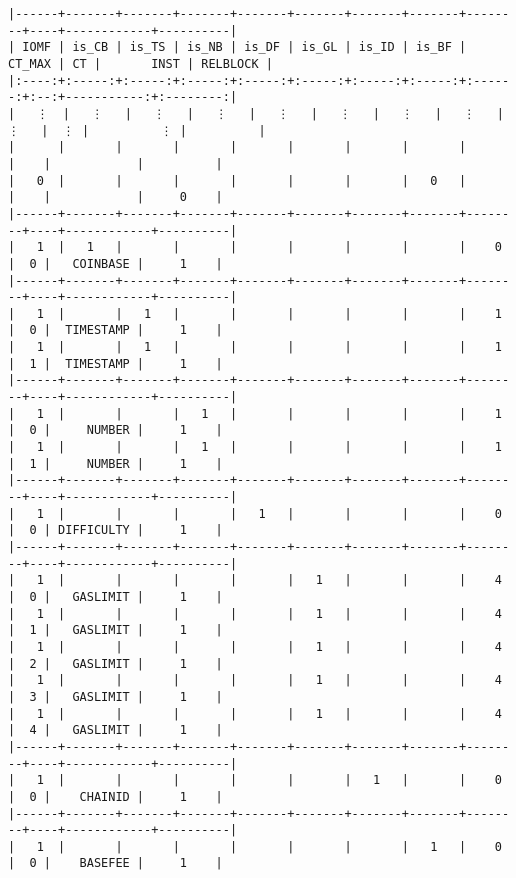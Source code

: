 \documentclass[varwidth=\maxdimen,margin=0.5cm,multi={verbatim}]{standalone}
\begin{document}
\begin{verbatim}
|------+-------+-------+-------+-------+-------+-------+-------+--------+----+------------+----------|
| IOMF | is_CB | is_TS | is_NB | is_DF | is_GL | is_ID | is_BF | CT_MAX | CT |       INST | RELBLOCK |
|:----:+:-----:+:-----:+:-----:+:-----:+:-----:+:-----:+:-----:+:------:+:--:+-----------:+:--------:|
|   ⋮  |   ⋮   |   ⋮   |   ⋮   |   ⋮   |   ⋮   |   ⋮   |   ⋮   |    ⋮   |  ⋮ |          ⋮ |          |
|      |       |       |       |       |       |       |       |        |    |            |          |
|   0  |       |       |       |       |       |       |   0   |        |    |            |     0    |
|------+-------+-------+-------+-------+-------+-------+-------+--------+----+------------+----------|
|   1  |   1   |       |       |       |       |       |       |    0   |  0 |   COINBASE |     1    |
|------+-------+-------+-------+-------+-------+-------+-------+--------+----+------------+----------|
|   1  |       |   1   |       |       |       |       |       |    1   |  0 |  TIMESTAMP |     1    |
|   1  |       |   1   |       |       |       |       |       |    1   |  1 |  TIMESTAMP |     1    |
|------+-------+-------+-------+-------+-------+-------+-------+--------+----+------------+----------|
|   1  |       |       |   1   |       |       |       |       |    1   |  0 |     NUMBER |     1    |
|   1  |       |       |   1   |       |       |       |       |    1   |  1 |     NUMBER |     1    |
|------+-------+-------+-------+-------+-------+-------+-------+--------+----+------------+----------|
|   1  |       |       |       |   1   |       |       |       |    0   |  0 | DIFFICULTY |     1    |
|------+-------+-------+-------+-------+-------+-------+-------+--------+----+------------+----------|
|   1  |       |       |       |       |   1   |       |       |    4   |  0 |   GASLIMIT |     1    |
|   1  |       |       |       |       |   1   |       |       |    4   |  1 |   GASLIMIT |     1    |
|   1  |       |       |       |       |   1   |       |       |    4   |  2 |   GASLIMIT |     1    |
|   1  |       |       |       |       |   1   |       |       |    4   |  3 |   GASLIMIT |     1    |
|   1  |       |       |       |       |   1   |       |       |    4   |  4 |   GASLIMIT |     1    |
|------+-------+-------+-------+-------+-------+-------+-------+--------+----+------------+----------|
|   1  |       |       |       |       |       |   1   |       |    0   |  0 |    CHAINID |     1    |
|------+-------+-------+-------+-------+-------+-------+-------+--------+----+------------+----------|
|   1  |       |       |       |       |       |       |   1   |    0   |  0 |    BASEFEE |     1    |

\end{verbatim}
\end{document}

